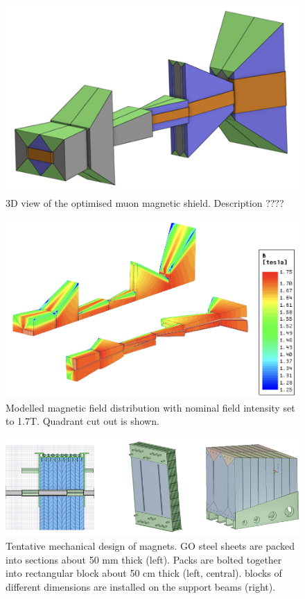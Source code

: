 \documentclass{article}
\begin{document}
\begin{figure}[thbp]
\centering
\includegraphics[width=0.7\columnwidth]{figs/shield_3dview.png}
\caption{3D view of the optimised muon magnetic shield. Description ????}
\label{fig:3dView}
\end{figure}

\begin{figure}[thbp]
\centering
\includegraphics[width=0.8\columnwidth]{figs/shield_field_quadrant.png}
\caption{Modelled magnetic field distribution with nominal field intensity set to 1.7T. Quadrant cut out is shown.}
\label{fig:shieldMagneticField}
\end{figure}

\begin{figure}[thbp]
\centering
\includegraphics[width=0.8\columnwidth]{figs/shieldConstruction.png}
\caption{Tentative mechanical design of magnets. GO steel sheets are packed into sections about 50 mm thick (left). 
Packs are bolted together into rectangular block about 50 cm thick (left, central). blocks of different dimensions are installed on the support beams (right).}
\label{fig:shieldConstruction}
\end{figure}
\end{document}
